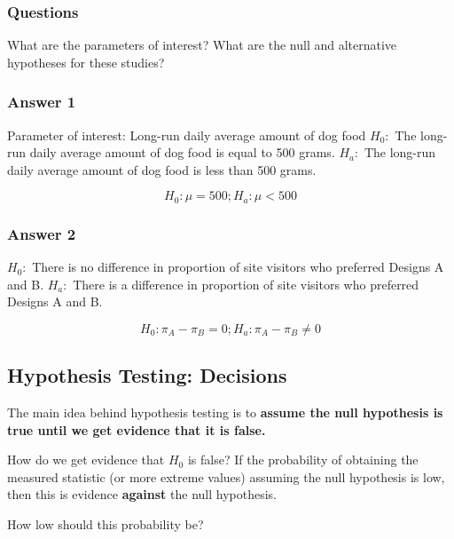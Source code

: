 \documentclass[
  letterpaper,
  DIV=11,
  numbers=noendperiod]{scrartcl}
\begin{document}
\subsubsection{Questions}

What are the parameters of interest? What are the null and alternative
hypotheses for these studies?

\subsubsection{Answer 1}

Parameter of interest: Long-run daily average amount of dog food
\(H_0:\) The long-run daily average amount of dog food is equal to 500
grams. \(H_a:\) The long-run daily average amount of dog food is less
than 500 grams.

\[
H_0: \mu = 500; H_a: \mu < 500
\]

\subsubsection{Answer 2}

\(H_0:\) There is no difference in proportion of site visitors who
preferred Designs A and B. \(H_a:\) There is a difference in proportion
of site visitors who preferred Designs A and B.

\[
H_0: \pi_A - \pi_B = 0; H_a: \pi_A-\pi_B \neq 0
\]

\subsection{Hypothesis Testing:
Decisions}\label{hypothesis-testing-decisions}

The main idea behind hypothesis testing is to \textbf{assume the null
hypothesis is true until we get evidence that it is false.}

\begin{tcolorbox}[enhanced jigsaw, bottomtitle=1mm, colback=white, opacityback=0, leftrule=.75mm, opacitybacktitle=0.6, coltitle=black, left=2mm, colframe=quarto-callout-note-color-frame, toptitle=1mm, colbacktitle=quarto-callout-note-color!10!white, titlerule=0mm, title=\textcolor{quarto-callout-note-color}{\faInfo}\hspace{0.5em}{Note}, arc=.35mm, rightrule=.15mm, breakable, bottomrule=.15mm, toprule=.15mm]

How do we get evidence that \(H_0\) is false? If the probability of
obtaining the measured statistic (or more extreme values) assuming the
null hypothesis is low, then this is evidence \textbf{against} the null
hypothesis.

How low should this probability be?

\end{tcolorbox}
\end{document}
